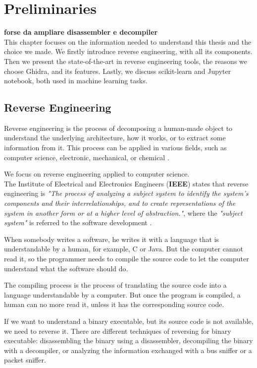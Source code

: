 \chapter{Preliminaries}
\textbf{forse da ampliare disassembler e decompiler}\\
This chapter focuses on the information needed to understand this thesis and the choice we made. We firstly introduce reverse engineering, with all its components. Then we present the state-of-the-art in reverse engineering tools, the reasons we choose Ghidra, and its features. Lastly, we discuss scikit-learn and Jupyter notebook, both used in machine learning tasks.

\section{Reverse Engineering}

Reverse engineering is the process of decomposing a human-made object to understand the underlying architecture, how it works, or to extract some information from it. This process can be applied in various fields, such as computer science, electronic, mechanical, or chemical \cite{eilam2011reversing}.

We focus on reverse engineering applied to computer science. 
\\

The Institute of Electrical and Electronics Engineers (\textbf{IEEE}) states that reverse engineering is \textit{"The process of analyzing a subject system to identify the system's components and their interrelationships, and to create representations of the system in another form or at a higher level of abstraction."}, where the \textit{"subject system"} is referred to the software development \cite{chikofsky1990reverse}. 

When somebody writes a software, he writes it with a language that is understandable by a human, for example, C or Java.  But the computer cannot read it, so the programmer needs to compile the source code to let the computer understand what the software should do. 

The compiling process is the process of translating the source code into a language understandable by a computer. But once the program is compiled, a human can no more read it, unless it has the corresponding source code. 

If we want to understand a binary executable, but its source code is not available, we need to reverse it. There are different techniques of reversing for binary executable: disassembling the binary using a disassembler, decompiling the binary with a decompiler, or analyzing the information exchanged with a bus sniffer or a packet sniffer.


